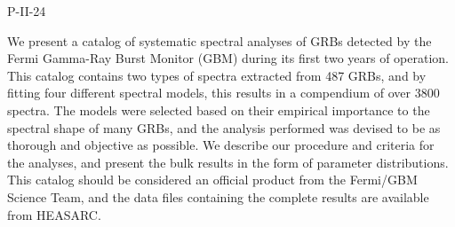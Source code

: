 P-II-24


\bigskip



\bigskip

\noindent We present a catalog of systematic spectral analyses of GRBs detected by the Fermi Gamma-Ray Burst Monitor (GBM) during its first two years of operation. This catalog contains two types of spectra extracted from 487 GRBs, and by fitting four different spectral models, this results in a compendium of over 3800 spectra. The models were selected based on their empirical importance to the spectral shape of many GRBs, and the analysis performed was devised to be as thorough and objective as possible. We describe our procedure and criteria for the analyses, and present the bulk results in the form of parameter distributions. This catalog should be considered an official product from the Fermi/GBM Science Team, and the data files containing the complete results are available from  HEASARC.

